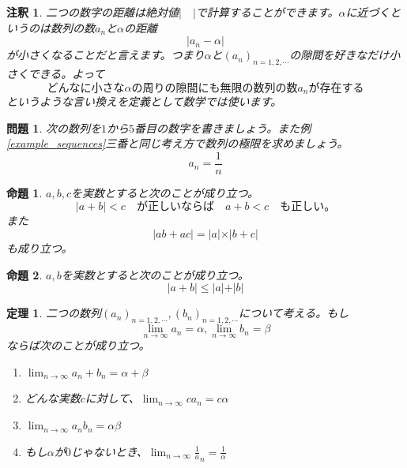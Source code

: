 \documentclass{ltjsarticle}
\newtheorem{theorem}{定理}[section]
\newtheorem{proposition}{命題}[section]
\newtheorem{exercise}{問題}
\newtheorem{remark}{注釈}[section]
\begin{document}
\begin{remark}
二つの数字の距離は絶対値$\vert\quad\vert$で計算することができます。$\alpha$に近づくというのは数列の数$a_n$と$\alpha$の距離
\begin{equation*}
\vert a_n-\alpha\vert
\end{equation*}
が小さくなることだと言えます。つまり$\alpha$と$(a_n)_{n=1,2,\cdots}$の隙間を好きなだけ小さくできる。よって
\begin{equation*}
\text{どんなに小さな$\alpha$の周りの隙間にも無限の数列の数$a_n$が存在する}
\end{equation*}
というような言い換えを定義として数学では使います。
\end{remark}

\begin{exercise}
次の数列を$1$から$5$番目の数字を書きましょう。また例\ref{example_sequences}三番と同じ考え方で数列の極限を求めましょう。
\begin{equation*}
a_n={\frac 1 n}
\end{equation*}
\end{exercise}

\begin{proposition}
$a,b,c$を実数とすると次のことが成り立つ。
\begin{equation*}
\vert a+b\vert < c\text{　が正しいならば　}a+b<c\text{　も正しい。}
\end{equation*}
また
\begin{equation*}
\vert ab+ac\vert =\vert a\vert\times\vert b+c\vert
\end{equation*}
も成り立つ。
\label{proposition_absolute_value_properties}
\end{proposition}

\begin{proposition}
$a,b$を実数とすると次のことが成り立つ。
\begin{equation*}
\vert a+b\vert \leq \vert a\vert+\vert b\vert
\end{equation*}
\label{proposition_triangle_inequality}
\end{proposition}

\begin{theorem}
\label{theorem_limit_properties}
二つの数列$(a_n)_{n=1,2,\cdots},(b_n)_{n=1,2,\cdots}$について考える。もし
\begin{equation*}
\lim_{n\to\infty}a_n = \alpha,\lim_{n\to\infty}b_n=\beta
\end{equation*}
ならば次のことが成り立つ。
\begin{enumerate}[1).]
\item $\lim_{n\to\infty}a_n +b_n = \alpha+\beta$
\item どんな実数$c$に対して、$\lim_{n\to\infty}c a_n = c\alpha$
\item $\lim_{n\to\infty} a_nb_n = \alpha\beta$
\item もし$\alpha$が$0$じゃないとき、$\lim_{n\to\infty}{\frac 1 a_n} = {\frac 1 \alpha}$
\end{enumerate}
\end{theorem}
\end{document}
